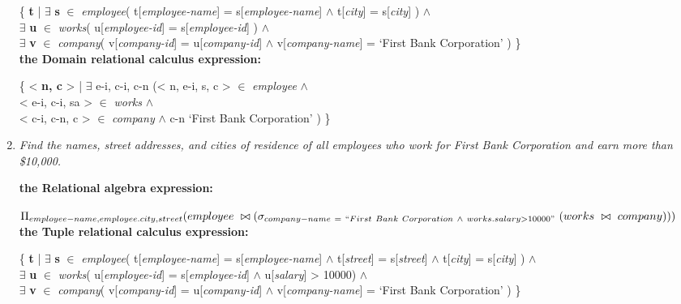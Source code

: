 \documentclass[paper=8.27in:11.69in, 14pt, DIV=calc]{scrartcl}
\begin{document}
\begin{enumerate}[label=\alph*)]
\{ \textbf{t} | $\exists$ \textbf{s} $\in$ \textit{employee}( t[\textit{employee-name}] = s[\textit{employee-name}] $\wedge$ t[\textit{city}] = s[\textit{city}] ) $\wedge$ \\ $\exists$ \textbf{u} $\in$ \textit{works}( u[\textit{employee-id}] = s[\textit{employee-id}] ) $\wedge$ \\ $\exists$ \textbf{v} $\in$ \textit{company}( v[\textit{company-id}] = u[\textit{company-id}] $\wedge$ v[\textit{company-name}] = `First Bank Corporation' ) \}\\

\textbf{the Domain relational calculus expression:\\}

\{ < \textbf{n, c} > | $\exists$ e-i, c-i, c-n (< n, e-i, s, c > $\in$ \textit{employee} $\wedge$ \\ < e-i, c-i, sa > $\in$ \textit{works} $\wedge$ \\ < c-i, c-n, c > $\in$ \textit{company} $\wedge$ c-n \neq `First Bank Corporation' ) \}\\

\newpage

\item \textit{Find the names, street addresses, and cities of residence of all employees who work for First Bank Corporation and earn more than \$10,000.\\}

\textbf{the Relational algebra expression:\\}

$\Pi_{employee-name,employee.city,street}(employee \ \bowtie \\ (\sigma_{company-name \ = \ ``First \ Bank \ Corporation \ \wedge \ works.salary>10000"} \ (works \ \bowtie \ company)))$\\

\textbf{the Tuple relational calculus expression:\\}

\{ \textbf{t} | $\exists$ \textbf{s} $\in$ \textit{employee}( t[\textit{employee-name}] = s[\textit{employee-name}] $\wedge$ t[\textit{street}] = s[\textit{street}] $\wedge$ t[\textit{city}] = s[\textit{city}] ) $\wedge$ \\ $\exists$ \textbf{u} $\in$ \textit{works}( u[\textit{employee-id}] = s[\textit{employee-id}] $\wedge$ u[\textit{salary}] > 10000) $\wedge$ \\ $\exists$ \textbf{v} $\in$ \textit{company}( v[\textit{company-id}] = u[\textit{company-id}] $\wedge$ v[\textit{company-name}] = `First Bank Corporation' ) \}\\


\end{enumerate}
\end{document}
